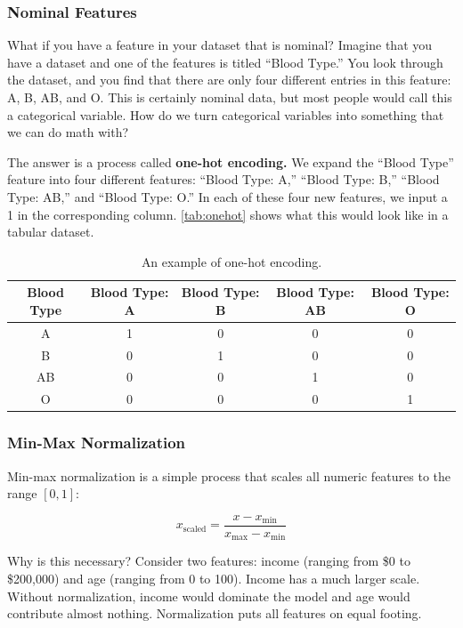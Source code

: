 \subsubsection*{Nominal Features}
What if you have a feature in your dataset that is nominal? Imagine that you have a dataset and one of the features is titled ``Blood Type.'' You look through the dataset, and you find that there are only four different entries in this feature: A, B, AB, and O. This is certainly nominal data, but most people would call this a categorical variable. How do we turn categorical variables into something that we can do math with?

The answer is a process called \textbf{one-hot encoding.} We expand the ``Blood Type'' feature into four different features: ``Blood Type: A,'' ``Blood Type: B,'' ``Blood Type: AB,'' and ``Blood Type: O.'' In each of these four new features, we input a 1 in the corresponding column. \autoref{tab:onehot} shows what this would look like in a tabular dataset.

\begin{table}
    \centering
    \begin{tabular}{c|cccc}
        Blood Type & Blood Type: A & Blood Type: B & Blood Type: AB & Blood Type: O \\ \hline
        A  & 1 & 0 & 0 & 0 \\
        B  & 0 & 1 & 0 & 0 \\
        AB & 0 & 0 & 1 & 0 \\
        O  & 0 & 0 & 0 & 1 \\
    \end{tabular}
    \caption{An example of one-hot encoding.}
    \label{tab:onehot}
\end{table}

\subsubsection*{Min-Max Normalization}
Min-max normalization is a simple process that scales all numeric features to the range $[0, 1]$:

\begin{equation}
    x_{\text{scaled}} = \frac{x - x_{\text{min}}}{x_{\text{max}} - x_{\text{min}}}
\end{equation}

Why is this necessary? Consider two features: income (ranging from \$0 to \$200,000) and age (ranging from 0 to 100). Income has a much larger scale. Without normalization, income would dominate the model and age would contribute almost nothing. Normalization puts all features on equal footing.

